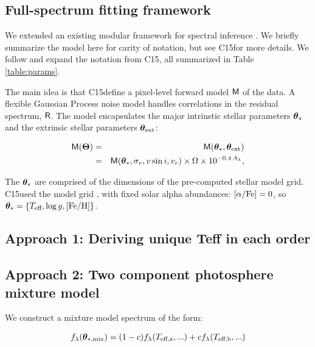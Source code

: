 \documentclass[onecolumn]{emulateapj}%
\newcommand{\iancze}{{\sc C15}}
\begin{document}
\subsection{Full-spectrum fitting framework}

We extended an existing modular framework for spectral inference \citep[][hereafter \iancze]{2015ApJ...812..128C}.  We briefly summarize the model here for carity of notation, but see \iancze for more details.  We follow and expand the notation from \iancze, all summarized in Table \ref{table:params}. 

The main idea is that \iancze define a pixel-level forward model $\mathsf{M}$ of the data.  A flexible Gaussian Process noise model handles correlations in the residual spectrum, $\mathsf{R}$.  The model encapsulates the major intrinstic stellar parameters ${\bm \theta}_{\ast}$ and the extrinsic stellar parameters ${\bm \theta}_{\rm ext}$:

\begin{eqnarray} \label{eqn:scaling}
\mathsf{M}({\bm \Theta}) &=& \mathsf{M}({\bm \theta}_{\ast}, {\bm \theta}_{\rm ext}) \\
         &=& \mathsf{M}({\bm \theta}_{\ast}, \sigma_v, v\sin{i}, v_r) \times \Omega \times 10^{-0.4\,A_{\lambda}}, \nonumber
\end{eqnarray}

The ${\bm \theta}_{\ast}$ are comprised of the dimensions of the pre-computed stellar model grid.  \iancze used the \PHOENIX model grid \citep{2013A&A...553A...6H}, with fixed solar alpha abundances: $[\alpha/{\rm Fe}] = 0$, so ${\bm \theta}_{\ast} = \{T_\textrm{eff}, \log g, [{\rm Fe}/{\rm H}] \}$.

\subsection{Approach 1: Deriving unique Teff in each order}


\subsection{Approach 2: Two component photosphere mixture model}

We construct a mixture model spectrum of the form:


\begin{eqnarray} \label{eqn:simple_mix}
f_\lambda({\bm \theta}_{\ast, \mathrm{mix}}) = (1-c) f_\lambda(T_\textrm{eff,a}, ...) + c f_\lambda(T_\textrm{eff,b}, ...)
\end{eqnarray}
\end{document}
